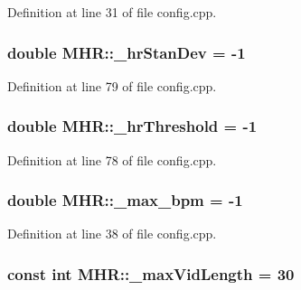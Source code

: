 Definition at line 31 of file config.\+cpp.

\hypertarget{namespace_m_h_r_aa202bc96d234c5ee044f8590ad1dc0ef}{
\subsubsection[{\+\_\+hr\+Stan\+Dev}]{\setlength{\rightskip}{0pt plus 5cm}double M\+H\+R\+::\+\_\+hr\+Stan\+Dev = -\/1}}\label{namespace_m_h_r_aa202bc96d234c5ee044f8590ad1dc0ef}


Definition at line 79 of file config.\+cpp.

\hypertarget{namespace_m_h_r_ad65f931bf0d5fecacaa5062119d272bf}{
\subsubsection[{\+\_\+hr\+Threshold}]{\setlength{\rightskip}{0pt plus 5cm}double M\+H\+R\+::\+\_\+hr\+Threshold = -\/1}}\label{namespace_m_h_r_ad65f931bf0d5fecacaa5062119d272bf}


Definition at line 78 of file config.\+cpp.

\hypertarget{namespace_m_h_r_a1a13273dd519ccfaf4dc1800bd2031d2}{
\subsubsection[{\+\_\+max\+\_\+bpm}]{\setlength{\rightskip}{0pt plus 5cm}double M\+H\+R\+::\+\_\+max\+\_\+bpm = -\/1}}\label{namespace_m_h_r_a1a13273dd519ccfaf4dc1800bd2031d2}


Definition at line 38 of file config.\+cpp.

\hypertarget{namespace_m_h_r_a0a7cdb59c1f1e8af6e6b61543c81724d}{
\subsubsection[{\+\_\+max\+Vid\+Length}]{\setlength{\rightskip}{0pt plus 5cm}const int M\+H\+R\+::\+\_\+max\+Vid\+Length = 30}}\label{namespace_m_h_r_a0a7cdb59c1f1e8af6e6b61543c81724d}


